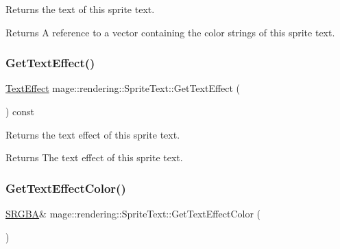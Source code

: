 Returns the text of this sprite text.

\begin{DoxyReturn}{Returns}
A reference to a vector containing the color strings of this sprite text. 
\end{DoxyReturn}
\hypertarget{classmage_1_1rendering_1_1_sprite_text_a7c61e9d50bb6c3c46507706e1aad8d5c}{}\label{classmage_1_1rendering_1_1_sprite_text_a7c61e9d50bb6c3c46507706e1aad8d5c} 
\subsubsection{\texorpdfstring{Get\+Text\+Effect()}{GetTextEffect()}}
{\footnotesize\ttfamily \hyperlink{classmage_1_1rendering_1_1_sprite_text_af07ecf28d2ab8997c011cab74e799ef7}{Text\+Effect} mage\+::rendering\+::\+Sprite\+Text\+::\+Get\+Text\+Effect (\begin{DoxyParamCaption}{ }\end{DoxyParamCaption}) const\hspace{0.3cm}{\ttfamily [noexcept]}}

Returns the text effect of this sprite text.

\begin{DoxyReturn}{Returns}
The text effect of this sprite text. 
\end{DoxyReturn}
\hypertarget{classmage_1_1rendering_1_1_sprite_text_abbb4d78110960dfdcab18a4319524332}{}\label{classmage_1_1rendering_1_1_sprite_text_abbb4d78110960dfdcab18a4319524332} 
\subsubsection{\texorpdfstring{Get\+Text\+Effect\+Color()}{GetTextEffectColor()}\hspace{0.1cm}{\footnotesize\ttfamily [1/2]}}
{\footnotesize\ttfamily \hyperlink{structmage_1_1_s_r_g_b_a}{S\+R\+G\+BA}\& mage\+::rendering\+::\+Sprite\+Text\+::\+Get\+Text\+Effect\+Color (\begin{DoxyParamCaption}{ }\end{DoxyParamCaption})\hspace{0.3cm}{\ttfamily [noexcept]}}

